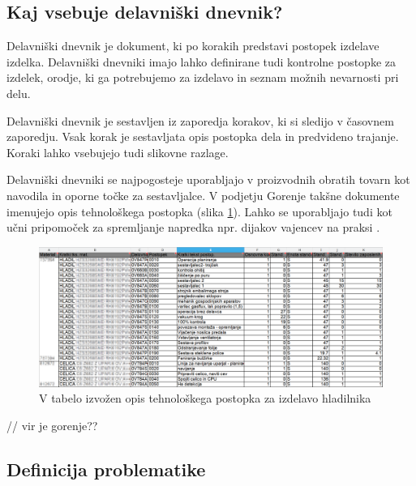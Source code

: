 \documentclass[a4paper, 12pt]{book}
\begin{document}
\subsection {Kaj vsebuje delavniški dnevnik?}

Delavniški dnevnik je dokument, ki po korakih predstavi postopek izdelave izdelka.
Delavniški dnevniki imajo lahko definirane tudi kontrolne postopke za izdelek, orodje, ki ga potrebujemo za izdelavo in seznam možnih nevarnosti pri delu.

Delavniški dnevnik je sestavljen iz zaporedja korakov, ki si sledijo v časovnem zaporedju.
Vsak korak je sestavljata opis postopka dela in predvideno trajanje.
Koraki lahko vsebujejo tudi slikovne razlage.

Delavniški dnevniki se najpogosteje uporabljajo v proizvodnih obratih tovarn kot navodila in oporne točke za sestavljalce.
V podjetju Gorenje takšne dokumente imenujejo opis tehnološkega postopka (slika \ref{sap_2}).
Lahko se uporabljajo tudi kot učni pripomoček za spremljanje napredka npr. dijakov vajencev na praksi \cite{delavniskidnevnikptuj}.

\begin{figure}[H]
\begin{center}
\includegraphics[width=13.5cm]{sap_2}
\end{center}
\caption{V tabelo izvožen opis tehnološkega postopka za izdelavo hladilnika}
\label{sap_2}
\end{figure}

// vir je gorenje?? 



\subsection{Definicija problematike}
\end{document}
